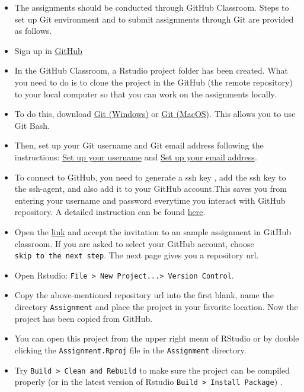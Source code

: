 \documentclass[
]{book}
\begin{document}
\begin{itemize}
\item
  The assignments should be conducted through GitHub Classroom. Steps to set up Git environment and to submit assignments through Git are provided as follows.
\item
  Sign up in \href{https://github.com/}{GitHub}
\item
  In the GitHub Classroom, a Rstudio project folder has been created. What you need to do is to clone the project in the GitHub (the remote repository) to your local computer so that you can work on the assignments locally.
\item
  To do this, download \href{https://git-scm.com/download/win}{Git (Windows)} or \href{https://git-scm.com/download/mac}{Git (MacOS)}. This allows you to use Git Bash.
\item
  Then, set up your Git username and Git email address following the instructions: \href{https://docs.github.com/en/github/using-git/setting-your-username-in-git}{Set up your username} and \href{https://docs.github.com/en/github/setting-up-and-managing-your-github-user-account/setting-your-commit-email-address}{Set up your email address}.
\item
  To connect to GitHub, you need to generate a ssh key , add the ssh key to the ssh-agent, and also add it to your GitHub account.This saves you from entering your username and password everytime you interact with GitHub repository. A detailed instruction can be found \href{https://docs.github.com/en/github/authenticating-to-github/connecting-to-github-with-ssh}{here}.
\item
  Open the \href{https://classroom.github.com/a/gyfGNzpF}{link} and accept the invitation to an sample assignment in GitHub classroom. If you are asked to select your GitHub account, choose \texttt{skip\ to\ the\ next\ step}. The next page gives you a repository url.
\item
  Open Rstudio: \texttt{File\ \textgreater{}\ New\ Project...\textgreater{}\ Version\ Control}.
\item
  Copy the above-mentioned repository url into the first blank, name the directory \texttt{Assignment} and place the project in your favorite location. Now the project has been copied from GitHub.
\item
  You can open this project from the upper right menu of RStudio or by double clicking the \texttt{Assignment.Rproj} file in the \texttt{Assignment} directory.
\item
  Try \texttt{Build\ \textgreater{}\ Clean\ and\ Rebuild} to make sure the project can be compiled properly (or in the latest version of Rstudio \texttt{Build\ \textgreater{}\ Install\ Package}) .

\end{itemize}
\end{document}
